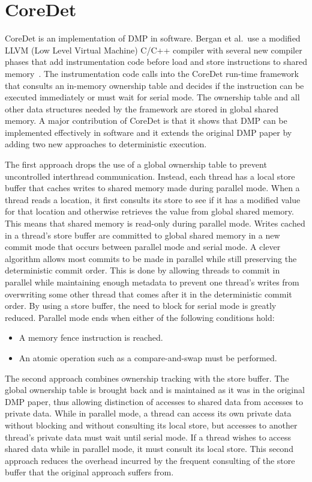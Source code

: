\section{CoreDet}

CoreDet is an implementation of DMP in software.  Bergan et al.\ use a
modified LLVM (Low Level Virtual Machine) C/C++ compiler with several
new compiler phases that add instrumentation code before load and
store instructions to shared memory~\cite{coredet}.  The
instrumentation code calls into the CoreDet run-time framework that
consults an in-memory ownership table and decides if the instruction
can be executed immediately or must wait for serial mode.  The
ownership table and all other data structures needed by the framework
are stored in global shared memory.  A major contribution of CoreDet
is that it shows that DMP can be implemented effectively in software
and it extends the original DMP paper by adding two new approaches to
deterministic execution.

The first approach drops the use of a global ownership table to
prevent uncontrolled interthread communication.  Instead, each thread
has a local store buffer that caches writes to shared memory made
during parallel mode.  When a thread reads a location, it first
consults its store to see if it has a modified value for that location
and otherwise retrieves the value from global shared memory.  This
means that shared memory is read-only during parallel mode.  Writes
cached in a thread's store buffer are committed to global shared
memory in a new commit mode that occurs between parallel mode and
serial mode.  A clever algorithm allows most commits to be made in
parallel while still preserving the deterministic commit order.  This
is done by allowing threads to commit in parallel while maintaining
enough metadata to prevent one thread's writes from overwriting some
other thread that comes after it in the deterministic commit order.
By using a store buffer, the need to block for serial mode is greatly
reduced.  Parallel mode ends when either of the following conditions
hold:

\begin{itemize}
\item A memory fence instruction is reached.

\item An atomic operation such as a compare-and-swap must be
  performed.
\end{itemize}

The second approach combines ownership tracking with the store buffer.
The global ownership table is brought back and is maintained as it was
in the original DMP paper, thus allowing distinction of accesses to
shared data from accesses to private data.  While in parallel mode, a
thread can access its own private data without blocking and without
consulting its local store, but accesses to another thread's private
data must wait until serial mode.  If a thread wishes to access shared
data while in parallel mode, it must consult its local store.  This
second approach reduces the overhead incurred by the frequent
consulting of the store buffer that the original approach suffers
from.

